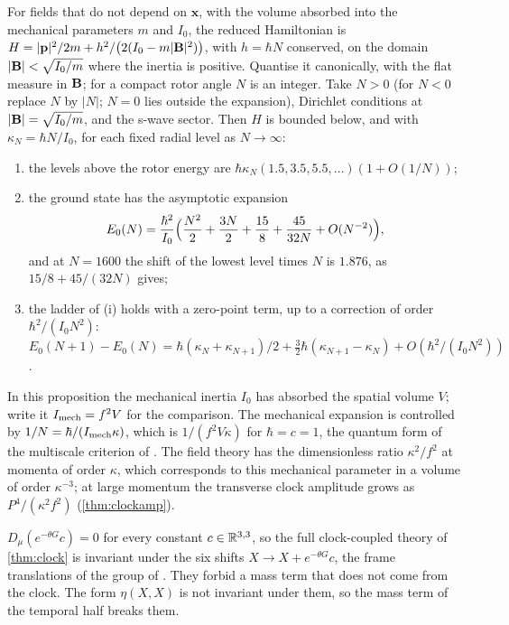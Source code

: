 \begin{proposition}
\label{prop:ladder}
For fields that do not depend on $\mathbf x$, with the volume absorbed into the mechanical parameters $m$ and $I_0$, the reduced Hamiltonian
is $H=|\mathbf p|^2/2m+h^2/\bigl(2(I_0-m|\mathbf B|^2)\bigr)$, with $h=\hbar N$ conserved, on the domain $|\mathbf B|<\sqrt{I_0/m}$ where the inertia is
positive. Quantise it canonically, with the flat measure in $\mathbf B$; for a compact rotor angle $N$ is an integer. Take $N>0$ (for $N<0$
replace $N$ by $|N|$; $N=0$ lies outside the expansion), Dirichlet conditions at $|\mathbf B|=\sqrt{I_0/m}$, and the s-wave sector. Then $H$ is
bounded below, and with $\kappa_N=\hbar N/I_0$, for each fixed radial level as $N\to\infty$:
\begin{enumerate}[label=(\roman*),leftmargin=2.2em,itemsep=1pt]
\item the levels above the rotor energy are $\hbar\kappa_N(1.5,3.5,5.5,\dots)(1+O(1/N))$;
\item the ground state has the asymptotic expansion
\[
E_0(N)=\frac{\hbar^2}{I_0}\Bigl(\frac{N^2}2+\frac{3N}2+\frac{15}8+\frac{45}{32N}+O(N^{-2})\Bigr),
\]
and at $N=1600$ the shift of the lowest level times $N$ is $1.876$, as $15/8+45/(32N)$ gives;
\item the ladder of (i) holds with a zero-point term, up to a correction of order $\hbar^2/(I_0N^2)$:
$E_0(N+1)-E_0(N)=\hbar(\kappa_N+\kappa_{N+1})/2+\tfrac32\hbar(\kappa_{N+1}-\kappa_N)+O(\hbar^2/(I_0N^2))$.
\end{enumerate}
\end{proposition}

In this proposition the mechanical inertia $I_0$ has absorbed the spatial volume $V$; write it $I_{\rm mech}=f^2V$ for the comparison. The
mechanical expansion is controlled by $1/N=\hbar/(I_{\rm mech}\kappa)$, which is $1/(f^2V\kappa)$ for $\hbar=c=1$, the quantum form of the
multiscale criterion of . The field theory has the dimensionless ratio $\kappa^2/f^2$ at momenta of order $\kappa$, which
corresponds to this mechanical parameter in a volume of order $\kappa^{-3}$; at large momentum the transverse clock amplitude grows as
$P^4/(\kappa^2f^2)$ (\cref{thm:clockamp}).

\begin{proposition}
\label{prop:shifts}
$D_\mu(e^{-\theta G}c)=0$ for every constant $c\in\mathbb{R}^{3,3}$, so the full clock-coupled theory of \cref{thm:clock} is invariant under the six
shifts $X\to X+e^{-\theta G}c$, the frame translations of the group of . They forbid a mass term that does not come from the
clock. The form $\eta(X,X)$ is not invariant under them, so the mass term of the temporal half breaks them.
\end{proposition}


